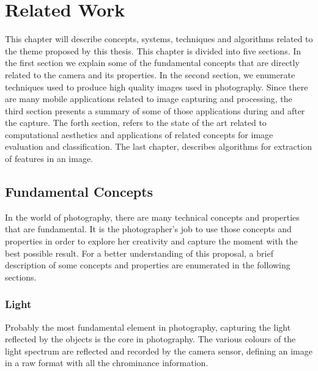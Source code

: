 \chapter{Related Work}
\label{cha:related_work}

This chapter will describe concepts, systems, techniques and algorithms related to the theme proposed by this thesis.
This chapter is divided into five sections. In the first section we explain some of the fundamental concepts that are directly related to the camera and its properties. In the second section, we enumerate techniques used to produce high quality images used in photography. Since there are many mobile applications related to image capturing and processing, the third section presents a summary of some of those applications during and after the capture. The forth section, refers to the state of the art related to computational aesthetics and applications of related concepts for image evaluation and classification. The last chapter, describes algorithms for extraction of features in an image.

\section{Fundamental Concepts}
\label{sec:concepts}
In the world of photography, there are many technical concepts and properties that are fundamental. It is the photographer's job to use those concepts and properties in order to explore her creativity and capture the moment with the best possible result.
For a better understanding of this proposal,  a brief description of some concepts and properties are enumerated in the following sections.

\subsection{Light}
\label{sub:light}
Probably the most fundamental element in photography, capturing the light reflected by the objects is the core in photography. The various colours of the light spectrum are reflected and recorded by the camera sensor, defining an image in a raw format with all the chrominance information.


